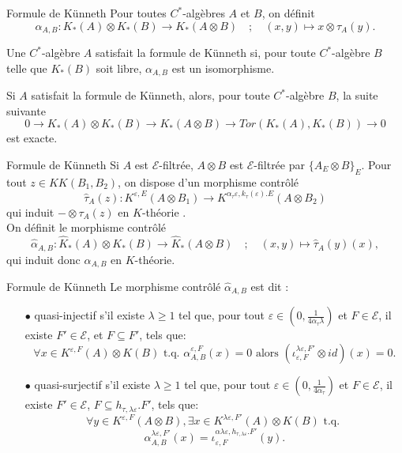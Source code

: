 \begin{frame}{Formule de Künneth}
Pour toutes $C^*$-algèbres $A$ et $B$, on définit
\[\alpha_{A,B} : K_*(A)\otimes K_*(B)\rightarrow K_*(A\otimes B) \quad ; \quad (x,y)\mapsto x\otimes   \tau_A(y).\]

\begin{definitionfr}
Une $C^*$-algèbre $A$ satisfait la formule de Künneth si, pour toute $C^*$-algèbre $B$ telle que $K_*(B)$ soit libre, $\alpha_{A,B}$ est un isomorphisme.
\end{definitionfr}

Si $A$ satisfait la formule de Künneth, alors, pour toute $C^*$-algèbre $B$, la suite suivante
\[0  \rightarrow K_*(A)\otimes K_*(B) \rightarrow K_*(A\otimes B)  \rightarrow Tor(K_*(A),K_*(B)) \rightarrow 0\]
est exacte.

\end{frame}

\begin{frame}{Formule de Künneth}
Si $A$ est $\mathcal E$-filtrée, $A\otimes B$ est $\mathcal E$-filtrée par $\{A_E\otimes B\}_E$. Pour tout $z \in KK(B_1,B_2)$, on dispose d'un morphisme contrôlé 
\[\hat \tau_A (z): K^{\varepsilon,E}(A\otimes B_1 ) \rightarrow K^{\alpha_\tau\varepsilon,k_\tau(\varepsilon).E}(A\otimes B_2)\]
qui induit $-\otimes \tau_A(z) $ en $K$-théorie \cite{OY2}.\\
\vspace{0.3 cm}
On définit le morphisme contrôlé  
\[\hat\alpha_{A,B} : \hat K_*(A)\otimes K_*(B)\rightarrow \hat K_*(A\otimes B) \quad ; \quad (x,y)\mapsto \hat\tau_A(y)(x),\]
qui induit donc $\alpha_{A,B}$ en $K$-théorie.\\
\end{frame}

\begin{frame}{Formule de Künneth}
Le morphisme contrôlé $\hat\alpha_{A,B}$ est dit :
\vspace{0.3 cm}
\begin{itemize}
 
\item[$\bullet$] quasi-injectif s'il existe $\lambda \geq 1$ tel que, pour tout $\varepsilon\in (0,\frac{1}{4\alpha_\tau \lambda})$ et $F\in\mathcal E$, il existe $F'\in\mathcal E$, et $F\subseteq F'$, tels que: 
\[\forall x\in K^{\varepsilon,F}(A)\otimes K(B)\text{ t.q. }\alpha_{A,B}^{\varepsilon,F}(x)=0 \text{ alors }(\iota_{\varepsilon,F}^{\lambda\varepsilon,F'}\otimes id) (x) = 0.\] 

\item[$\bullet$] quasi-surjectif s'il existe $\lambda \geq 1$ tel que, pour tout $\varepsilon \in (0,\frac{1}{4\alpha_\tau})$ et $F\in\mathcal E$, il existe $F'\in\mathcal E$, $F\subseteq h_{\tau,\lambda\varepsilon}.F'$, tels que:
\[ \forall y\in K^{\varepsilon,F}(A\otimes B), \exists x\in K^{\lambda\varepsilon, F'}(A)\otimes K(B) \text{ t.q. }\]
\[\alpha^{\lambda\varepsilon,F'}_{A,B}(x)=\iota_{\varepsilon,F}^{\alpha\lambda\varepsilon,h_{\tau, \lambda\varepsilon}.F'}(y).\] 

\end{itemize}
\end{frame}

